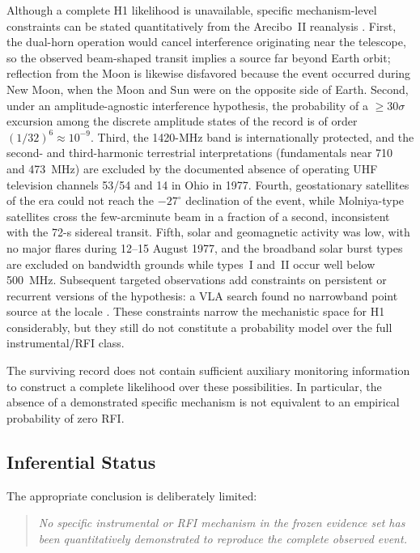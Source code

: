 \documentclass[twocolumn]{aastex701}
\begin{document}
Although a complete H1 likelihood is unavailable, specific mechanism-level constraints can be stated quantitatively from the Arecibo~II reanalysis \citep{mendez2025}. First, the dual-horn operation would cancel interference originating near the telescope, so the observed beam-shaped transit implies a source far beyond Earth orbit; reflection from the Moon is likewise disfavored because the event occurred during New Moon, when the Moon and Sun were on the opposite side of Earth. Second, under an amplitude-agnostic interference hypothesis, the probability of a $\geq30\sigma$ excursion among the discrete amplitude states of the record is of order $(1/32)^6\approx10^{-9}$. Third, the 1420-MHz band is internationally protected, and the second- and third-harmonic terrestrial interpretations (fundamentals near 710 and 473~MHz) are excluded by the documented absence of operating UHF television channels 53/54 and 14 in Ohio in 1977. Fourth, geostationary satellites of the era could not reach the $-27^\circ$ declination of the event, while Molniya-type satellites cross the few-arcminute beam in a fraction of a second, inconsistent with the 72-s sidereal transit. Fifth, solar and geomagnetic activity was low, with no major flares during 12--15 August 1977, and the broadband solar burst types are excluded on bandwidth grounds while types~I and~II occur well below 500~MHz. Subsequent targeted observations add constraints on persistent or recurrent versions of the hypothesis: a VLA search found no narrowband point source at the locale \citep{gray2001}. These constraints narrow the mechanistic space for H1 considerably, but they still do not constitute a probability model over the full instrumental/RFI class.

The surviving record does not contain sufficient auxiliary monitoring information to construct a complete likelihood over these possibilities. In particular, the absence of a demonstrated specific mechanism is not equivalent to an empirical probability of zero RFI.

\subsection{Inferential Status}

The appropriate conclusion is deliberately limited:
\begin{quote}
\emph{No specific instrumental or RFI mechanism in the frozen evidence set has been quantitatively demonstrated to reproduce the complete observed event.}
\end{quote}
\end{document}
